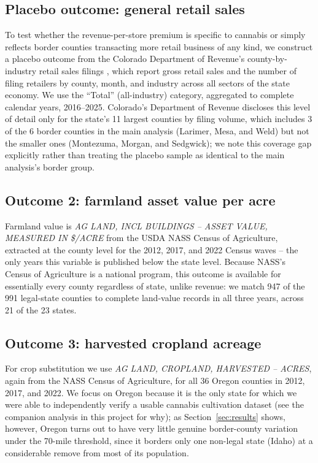 ﻿\documentclass{article}
\begin{document}
\subsection{Placebo outcome: general retail sales}

To test whether the revenue-per-store premium is specific to cannabis or simply reflects border counties
transacting more retail business of any kind, we construct a placebo outcome from the Colorado Department
of Revenue's county-by-industry retail sales filings \citep{CDORRetailByCounty}, which report gross retail
sales and the number of filing retailers by county, month, and industry across all sectors of the state
economy. We use the ``Total'' (all-industry) category, aggregated to complete calendar years,
2016--2025. Colorado's Department of Revenue discloses this level of detail only for the state's 11
largest counties by filing volume, which includes 3 of the 6 border counties in the main analysis
(Larimer, Mesa, and Weld) but not the smaller ones (Montezuma, Morgan, and Sedgwick); we note this
coverage gap explicitly rather than treating the placebo sample as identical to the main analysis's
border group.

\subsection{Outcome 2: farmland asset value per acre}

Farmland value is \emph{AG LAND, INCL BUILDINGS -- ASSET VALUE, MEASURED IN \$/ACRE} from the USDA NASS
Census of Agriculture, extracted at the county level for the 2012, 2017, and 2022 Census waves -- the only
years this variable is published below the state level. Because NASS's Census of Agriculture is a
national program, this outcome is available for essentially every county regardless of state, unlike
revenue: we match 947 of the 991 legal-state counties to complete land-value records in all three years,
across 21 of the 23 states.

\subsection{Outcome 3: harvested cropland acreage}

For crop substitution we use \emph{AG LAND, CROPLAND, HARVESTED -- ACRES}, again from the NASS Census of
Agriculture, for all 36 Oregon counties in 2012, 2017, and 2022. We focus on Oregon because it is the only
state for which we were able to independently verify a usable cannabis cultivation dataset (see the
companion analysis in this project for why); as Section~\ref{sec:results} shows, however, Oregon turns out
to have very little genuine border-county variation under the 70-mile threshold, since it borders only
one non-legal state (Idaho) at a considerable remove from most of its population.
\end{document}
